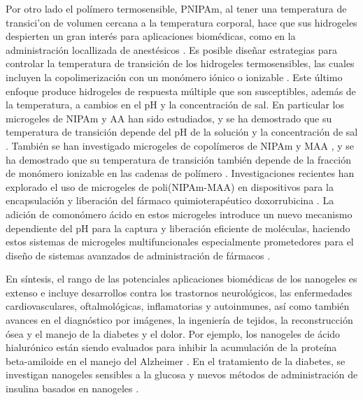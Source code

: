 
Por otro lado el pol\'imero termosensible, PNIPAm, al tener una temperatura de transici'on de volumen cercana a la temperatura corporal, hace que sus hidrogeles despierten un gran inter\'es para aplicaciones biom\'edicas, como en la administraci\'on locallizada de anest\'esicos \cite{Guan2011, indulekha2016thermoresponsive}.
Es posible dise\~nar estrategias para controlar la temperatura de transici\'on de los hidrogeles termosensibles, las cuales incluyen la copolimerizaci\'on con un mon\'omero i\'onico o ionizable \cite{Cai2007,Macchione2019, Hirose1987,Lopez2020}.
Este \'ultimo enfoque produce hidrogeles de respuesta m\'ultiple que son susceptibles, adem\'as de la temperatura, a cambios en el pH y la concentraci\'on de sal.
En particular los microgeles de NIPAm y AA han sido estudiados, y se ha demostrado que su temperatura de transici\'on depende del pH de la soluci\'on y la concentraci\'on de sal \cite{Morris1997, Jones2000,Bradley2005,Begum2016}.
Tambi\'en se han investigado microgeles de copol\'imeros de NIPAm y MAA \cite{Dowding2000,Hoare2004,Giussi2015}, y se ha demostrado que su temperatura de transici\'on tambi\'en depende de la fracci\'on de mon\'omero ionizable en las cadenas de pol\'imero \cite{Morris1997,Jones2000, Hoare2004, Bradley2005, Lee2008,Wong2009,Hamzavi2016}.
Investigaciones recientes han explorado el uso de microgeles de poli(NIPAm-MAA) en dispositivos para la encapsulaci\'on y liberaci\'on del f\'armaco quimioterap\'eutico doxorrubicina \cite{Giussi2020, MartinezMoro2020, Pergushov2020}. La adici\'on de comon\'omero \'acido en estos microgeles introduce un nuevo mecanismo dependiente del pH para la captura y liberaci\'on eficiente de mol\'eculas, haciendo estos sistemas de microgeles multifuncionales especialmente prometedores para el dise\~no de sistemas avanzados de administraci\'on de f\'armacos \cite{Liu2017}.

En s\'intesis, el rango de las potenciales aplicaciones biom\'edicas de los nanogeles es extenso e incluye desarrollos contra los trastornos neurol\'ogicos, las enfermedades cardiovasculares, oftalmol\'ogicas, inflamatorias y autoinmunes, as\'i como tambi\'en avances en el diagn\'ostico por im\'agenes, la ingenier\'ia de tejidos, la reconstrucci\'on \'osea y el manejo de la diabetes y el dolor. Por ejemplo, los nanogeles de \'acido hialur\'onico est\'an siendo evaluados para inhibir la acumulaci\'on de la prote\'ina beta-amiloide en el manejo del Alzheimer \cite{jiang2018nanogels}. En el tratamiento de la diabetes, se investigan nanogeles sensibles a la glucosa \cite{wu2010multifunctional} y nuevos m\'etodos de administraci\'on de insulina basados en nanogeles \cite{nolan2004thermally}.

